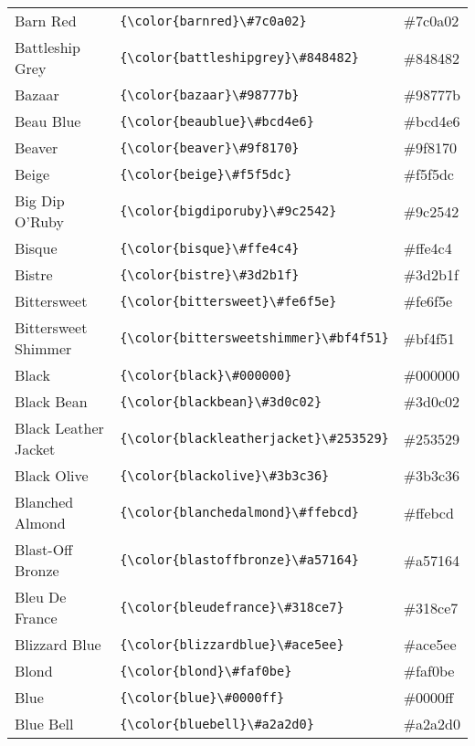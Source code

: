 \documentclass[9.5pt]{article}
\begin{document}
\begin{longtable}{l | l | l}
	Barn Red & \verb!{\color{barnred}\#7c0a02}! & {\color{barnred}\#7c0a02}\\
	Battleship Grey & \verb!{\color{battleshipgrey}\#848482}! & {\color{battleshipgrey}\#848482}\\
	Bazaar & \verb!{\color{bazaar}\#98777b}! & {\color{bazaar}\#98777b}\\
	Beau Blue & \verb!{\color{beaublue}\#bcd4e6}! & {\color{beaublue}\#bcd4e6}\\
	Beaver & \verb!{\color{beaver}\#9f8170}! & {\color{beaver}\#9f8170}\\
	Beige & \verb!{\color{beige}\#f5f5dc}! & {\color{beige}\#f5f5dc}\\
	Big Dip O’Ruby & \verb!{\color{bigdiporuby}\#9c2542}! & {\color{bigdiporuby}\#9c2542}\\
	Bisque & \verb!{\color{bisque}\#ffe4c4}! & {\color{bisque}\#ffe4c4}\\
	Bistre & \verb!{\color{bistre}\#3d2b1f}! & {\color{bistre}\#3d2b1f}\\
	Bittersweet & \verb!{\color{bittersweet}\#fe6f5e}! & {\color{bittersweet}\#fe6f5e}\\
	Bittersweet Shimmer & \verb!{\color{bittersweetshimmer}\#bf4f51}! & {\color{bittersweetshimmer}\#bf4f51}\\
	Black & \verb!{\color{black}\#000000}! & {\color{black}\#000000}\\
	Black Bean & \verb!{\color{blackbean}\#3d0c02}! & {\color{blackbean}\#3d0c02}\\
	Black Leather Jacket & \verb!{\color{blackleatherjacket}\#253529}! & {\color{blackleatherjacket}\#253529}\\
	Black Olive & \verb!{\color{blackolive}\#3b3c36}! & {\color{blackolive}\#3b3c36}\\
	Blanched Almond & \verb!{\color{blanchedalmond}\#ffebcd}! & {\color{blanchedalmond}\#ffebcd}\\
	Blast-Off Bronze & \verb!{\color{blastoffbronze}\#a57164}! & {\color{blastoffbronze}\#a57164}\\
	Bleu De France & \verb!{\color{bleudefrance}\#318ce7}! & {\color{bleudefrance}\#318ce7}\\
	Blizzard Blue & \verb!{\color{blizzardblue}\#ace5ee}! & {\color{blizzardblue}\#ace5ee}\\
	Blond & \verb!{\color{blond}\#faf0be}! & {\color{blond}\#faf0be}\\
	Blue & \verb!{\color{blue}\#0000ff}! & {\color{blue}\#0000ff}\\
	Blue Bell & \verb!{\color{bluebell}\#a2a2d0}! & {\color{bluebell}\#a2a2d0}\\

\end{longtable}
\end{document}
